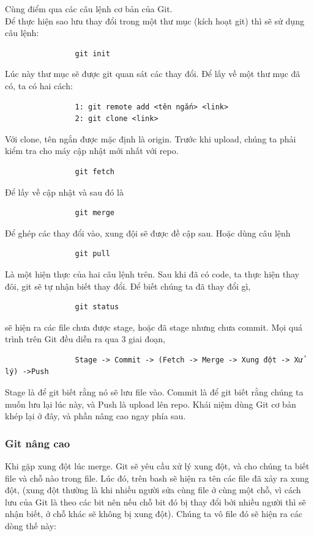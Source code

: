 \documentclass[12pt,a4paper]{report}
\begin{document}
            Cùng điểm qua các câu lệnh cơ bản của Git.\\
            Để thực hiện sao lưu thay đổi trong một thư mục (kích hoạt git) thì sẽ sử dụng câu lệnh:
            \begin{verbatim}
                git init
            \end{verbatim}
            Lúc này thư mục sẽ được git quan sát các thay đổi.
            Để lấy về một thư mục đã có, ta có hai cách:
            \begin{verbatim}
                1: git remote add <tên ngắn> <link>
                2: git clone <link>
            \end{verbatim}
            Với clone, tên ngắn được mặc định là origin.
            Trước khi upload, chúng ta phải kiểm tra cho máy cập nhật mới nhất với repo.
            \begin{verbatim}
                git fetch
            \end{verbatim}
            Để lấy về cập nhật và sau đó là
            \begin{verbatim}
                git merge
            \end{verbatim}
            Để ghép các thay đổi vào, xung đội sẽ được đề cập sau.
            Hoặc dùng câu lệnh
            \begin{verbatim}
                git pull
            \end{verbatim}
            Là một hiện thực của hai câu lệnh trên.
            Sau khi đã có code, ta thực hiện thay đôi, git sẽ tự nhận biết thay đổi. Để biết chúng ta đã thay đổi gì,
            \begin{verbatim}
                git status
            \end{verbatim}
            sẽ hiện ra các file chưa được stage, hoặc đã stage nhưng chưa commit.
            Mọi quá trình trên Git đều diễn ra qua 3 giai đoạn,
            \begin{verbatim}
                Stage -> Commit -> (Fetch -> Merge -> Xung đột -> Xử lý) ->Push
            \end{verbatim}
            Stage là để git biết rằng nó sẽ lưu file vào. Commit là để git biết rằng chúng ta muốn lưu lại lúc này, và Push là upload lên repo.
            Khái niệm dùng Git cơ bản khép lại ở đây, và phần nâng cao ngay phía sau.

            \subsubsection{Git nâng cao}
            Khi gặp xung đột lúc merge. Git sẽ yêu cầu xử lý xung đột, và cho chúng ta biết file và chỗ nào trong file. Lúc đó, trên bash sẽ hiện ra tên các file đã xảy ra xung đột, (xung đột thường là khi nhiều người sửa cùng file ở cùng một chỗ, vì cách lưu của Git là theo các bit nên nếu chỗ bit đó bị thay đổi bởi nhiều người thì sẽ nhận biết, ở chỗ khác sẽ không bị xung đột). Chúng ta vô file đó sẽ hiện ra các dòng thế này:\par
\end{document}
